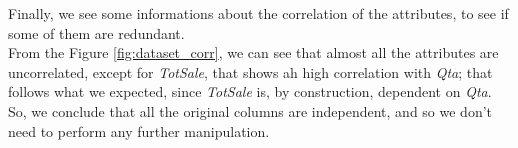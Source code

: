 Finally, we see some informations about the correlation of the attributes, to see if some of them are redundant.\\
From the Figure \ref{fig:dataset_corr}, we can see that almost all the attributes are uncorrelated, except for \emph{TotSale}, that shows ah high correlation with \emph{Qta}; that follows what we expected, since \emph{TotSale} is, by construction, dependent on \emph{Qta}. So, we conclude that all the original columns are independent, and so we don't need to perform any further manipulation.
